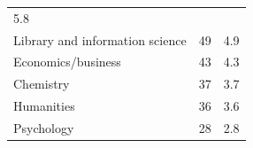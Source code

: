 \documentclass[]{article}
\begin{document}
\begin{longtable}[]{@{}lrr@{}}
\begin{minipage}[t]{0.05\columnwidth}
5.8\strut
\end{minipage}\tabularnewline
\begin{minipage}[t]{0.81\columnwidth}\raggedright\strut
Library and information science\strut
\end{minipage} & \begin{minipage}[t]{0.05\columnwidth}\raggedleft\strut
49\strut
\end{minipage} & \begin{minipage}[t]{0.05\columnwidth}\raggedleft\strut
4.9\strut
\end{minipage}\tabularnewline
\begin{minipage}[t]{0.81\columnwidth}\raggedright\strut
Economics/business\strut
\end{minipage} & \begin{minipage}[t]{0.05\columnwidth}\raggedleft\strut
43\strut
\end{minipage} & \begin{minipage}[t]{0.05\columnwidth}\raggedleft\strut
4.3\strut
\end{minipage}\tabularnewline
\begin{minipage}[t]{0.81\columnwidth}\raggedright\strut
Chemistry\strut
\end{minipage} & \begin{minipage}[t]{0.05\columnwidth}\raggedleft\strut
37\strut
\end{minipage} & \begin{minipage}[t]{0.05\columnwidth}\raggedleft\strut
3.7\strut
\end{minipage}\tabularnewline
\begin{minipage}[t]{0.81\columnwidth}\raggedright\strut
Humanities\strut
\end{minipage} & \begin{minipage}[t]{0.05\columnwidth}\raggedleft\strut
36\strut
\end{minipage} & \begin{minipage}[t]{0.05\columnwidth}\raggedleft\strut
3.6\strut
\end{minipage}\tabularnewline
\begin{minipage}[t]{0.81\columnwidth}\raggedright\strut
Psychology\strut
\end{minipage} & \begin{minipage}[t]{0.05\columnwidth}\raggedleft\strut
28\strut
\end{minipage} & \begin{minipage}[t]{0.05\columnwidth}\raggedleft\strut
2.8\strut
\end{minipage}\tabularnewline

\end{longtable}
\end{document}
